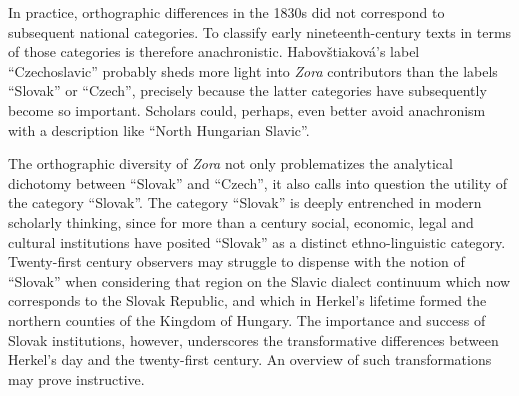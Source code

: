 In practice, orthographic differences in the 1830s did not correspond to subsequent national categories. To classify early nineteenth-century texts in terms of those categories is therefore anachronistic. Habovštiaková’s label “Czechoslavic” probably sheds more light into \textit{Zora} contributors than the labels “Slovak” or “Czech”, precisely because the latter categories have subsequently become so important. Scholars could, perhaps, even better avoid anachronism with a description like “North Hungarian Slavic”.

The orthographic diversity of \textit{Zora} not only problematizes the analytical dichotomy between “Slovak” and “Czech”, it also calls into question the utility of the category “Slovak”. The category “Slovak” is deeply entrenched in modern scholarly thinking, since for more than a century social, economic, legal and cultural institutions have posited “Slovak” as a distinct ethno-linguistic category. Twenty-first century observers may struggle to dispense with the notion of “Slovak” when considering that region on the Slavic dialect continuum which now corresponds to the Slovak Republic, and which in Herkel’s lifetime formed the northern counties of the Kingdom of Hungary. The importance and success of Slovak institutions, however, underscores the transformative differences between Herkel’s day and the twenty-first century. An overview of such transformations may prove instructive.

